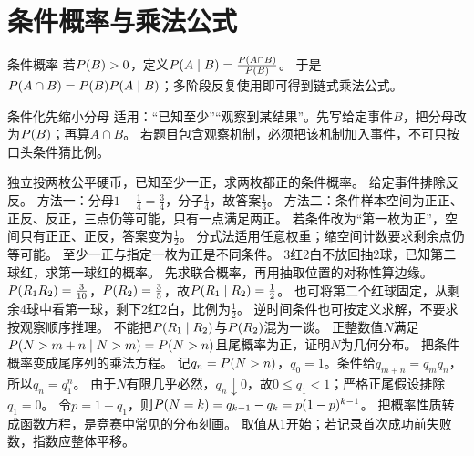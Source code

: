 \section{条件概率与乘法公式}\label{sec:13}
\begin{definition}{条件概率}
若$P(B)>0$，定义$P(A\mid B)=\frac{P(A\cap B)}{P(B)}$。
于是$P(A\cap B)=P(B)P(A\mid B)$；多阶段反复使用即可得到链式乘法公式。
\end{definition}
\begin{method}{条件化先缩小分母}
适用：“已知至少”“观察到某结果”。先写给定事件$B$，把分母改为$P(B)$；再算$A\cap B$。
若题目包含观察机制，必须把该机制加入事件，不可只按口头条件猜比例。
\end{method}
{独立投两枚公平硬币，已知至少一正，求两枚都正的条件概率。}
{给定事件排除反反。}
{方法一：分母$1-\frac{1}{4}=\frac{3}{4}$，分子$\frac{1}{4}$，故答案$\frac{1}{3}$。
方法二：条件样本空间为正正、正反、反正，三点仍等可能，只有一点满足两正。
若条件改为“第一枚为正”，空间只有正正、正反，答案变为$\frac{1}{2}$。}
{分式法适用任意权重；缩空间计数要求剩余点仍等可能。}
{至少一正与指定一枚为正是不同条件。}
{3红2白不放回抽2球，已知第二球红，求第一球红的概率。}
{先求联合概率，再用抽取位置的对称性算边缘。}
{$P(R_1R_2)=\frac{3}{10}$，$P(R_2)=\frac{3}{5}$，故$P(R_1\mid R_2)=\frac{1}{2}$。
也可将第二个红球固定，从剩余4球中看第一球，剩下2红2白，比例为$\frac{1}{2}$。}
{逆时间条件也可按定义求解，不要求按观察顺序推理。}
{不能把$P(R_1\mid R_2)$与$P(R_2)$混为一谈。}
{正整数值$N$满足$P(N>m+n\mid N>m)=P(N>n)$且尾概率为正，证明$N$为几何分布。}
{把条件概率变成尾序列的乘法方程。}
{记$q_n=P(N>n)$，$q_0=1$。条件给$q_{m+n}=q_mq_n$，所以$q_n=q_1^n$。
由于$N$有限几乎必然，$q_n\downarrow0$，故$0\le q_1<1$；严格正尾假设排除$q_1=0$。
令$p=1-q_1$，则$P(N=k)=q_{k-1}-q_k=p(1-p)^{k-1}$。}
{把概率性质转成函数方程，是竞赛中常见的分布刻画。}
{取值从1开始；若记录首次成功前失败数，指数应整体平移。}


